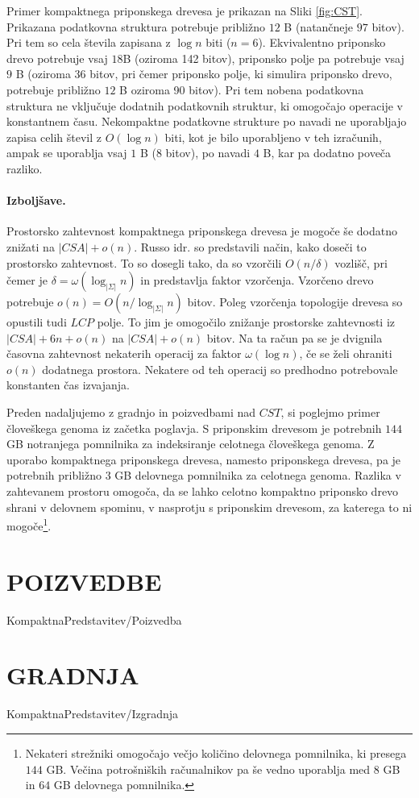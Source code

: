 Primer kompaktnega priponskega drevesa je prikazan na Sliki \ref{fig:CST}. Prikazana podatkovna struktura potrebuje približno $12$ B (natančneje $97$ bitov). Pri tem so cela števila zapisana z $\log{n}$ biti ($n=6$). Ekvivalentno priponsko drevo potrebuje vsaj $18$B (oziroma 142 bitov), priponsko polje pa potrebuje vsaj $9$ B (oziroma 36 bitov, pri čemer priponsko polje, ki simulira priponsko drevo, potrebuje približno $12$ B oziroma 90 bitov). Pri tem nobena podatkovna struktura ne vključuje dodatnih podatkovnih struktur, ki omogočajo operacije v konstantnem času. Nekompaktne podatkovne strukture po navadi ne uporabljajo zapisa celih števil z $O(\log{n})$ biti, kot je bilo uporabljeno v teh izračunih, ampak se uporablja vsaj $1$ B (8 bitov), po navadi $4$ B, kar pa dodatno poveča razliko.

\paragraph{Izboljšave.}
Prostorsko zahtevnost kompaktnega priponskega drevesa je mogoče še dodatno znižati na $|CSA|+o(n)$. Russo idr. \cite{Russo2008} so predstavili način, kako doseči to prostorsko zahtevnost. To so dosegli tako, da so vzorčili $O(n/\delta)$ vozlišč, pri čemer je $\delta=\omega(\log_{|\Sigma|}{n})$ in predstavlja faktor vzorčenja. Vzorčeno drevo potrebuje $o(n)=O(n/\log_{|\Sigma|}{n})$ bitov. Poleg vzorčenja topologije drevesa so opustili tudi $LCP$ polje. To jim je omogočilo znižanje prostorske zahtevnosti iz $|CSA|+6n+o(n)$ na $|CSA|+o(n)$ bitov. Na ta račun pa se je dvignila časovna zahtevnost nekaterih operacij za faktor $\omega(\log{n})$, če se želi ohraniti $o(n)$ dodatnega prostora. Nekatere od teh operacij so predhodno potrebovale konstanten čas izvajanja.

Preden nadaljujemo z gradnjo in poizvedbami nad $CST$, si poglejmo primer človeškega genoma iz začetka poglavja. S priponskim drevesom je potrebnih $144$ GB notranjega pomnilnika za indeksiranje celotnega človeškega genoma. Z uporabo kompaktnega priponskega drevesa, namesto priponskega drevesa, pa je potrebnih približno $3$ GB delovnega pomnilnika za celotnega genoma. Razlika v zahtevanem prostoru omogoča, da se lahko celotno kompaktno priponsko drevo shrani v delovnem spominu, v nasprotju s priponskim drevesom, za katerega to ni mogoče\footnote{Nekateri strežniki omogočajo večjo količino delovnega pomnilnika, ki presega $144$ GB. Večina potrošniških računalnikov pa še vedno uporablja med $8$ GB in $64$ GB delovnega pomnilnika.}.

\section{POIZVEDBE}\label{sec:CSTpoizvedba}
{KompaktnaPredstavitev/Poizvedba}

\section{GRADNJA}\label{sec:CSTizgradnja}
{KompaktnaPredstavitev/Izgradnja}




